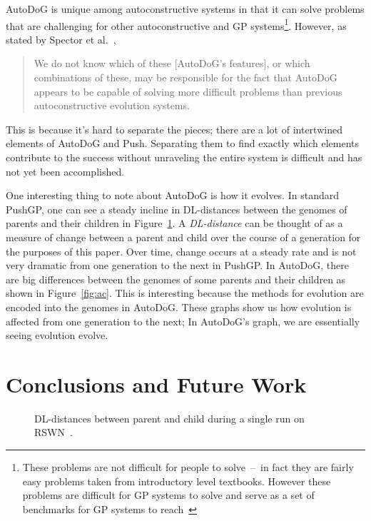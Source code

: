 \documentclass{sig-alternate}
\begin{document}
AutoDoG is unique among autoconstructive systems in that it can solve problems that are challenging for other autoconstructive and GP systems\footnote{These problems are not difficult for people to solve~--~in fact they are fairly easy problems taken from introductory level textbooks. However these problems are difficult for GP systems to solve and serve as a set of benchmarks for GP systems to reach~\cite{helmuth:2015}}. However, as stated by Spector et al.~\cite{spector:2016},
\begin{quotation}
	We do not know which of these [AutoDoG's features], or which combinations of these, may be responsible for the fact that AutoDoG appears to be capable of solving more difficult problems than previous autoconstructive evolution systems.
\end{quotation}
This is because it's hard to separate the pieces; there are a lot of intertwined elements of AutoDoG and Push. Separating them to find exactly which elements contribute to the success without unraveling the entire system is difficult and has not yet been accomplished.


One interesting thing to note about AutoDoG is how it evolves. In standard PushGP, one can see a steady incline in DL-distances between the genomes of parents and their children in Figure~\ref{fig:standard}. A \textit{DL-distance} can be thought of as a measure of change between a parent and child over the course of a generation for the purposes of this paper. Over time, change occurs at a steady rate and is not very dramatic from one generation to the next in PushGP. In AutoDoG, there are big differences between the genomes of some parents and their children as shown in Figure~\ref{fig:ac}. This is interesting because the methods for evolution are encoded into the genomes in AutoDoG. These graphs show us how evolution is affected from one generation to the next; In AutoDoG's graph, we are essentially seeing evolution evolve.

\section{Conclusions and Future Work}
\label{sec:conclusion}
\begin{figure}
	\caption{DL-distances between parent and child during a single run on RSWN~\cite{spector:2016}.}
	\label{fig:standard}
\end{figure}
\end{document}
